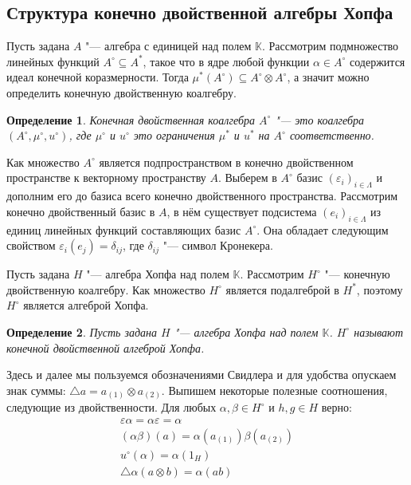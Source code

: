 \documentclass[a4paper, 12pt]{article}
\newtheorem*{definition}{Определение}
\theoremstyle{definition}
\begin{document}
\newpage

\subsection{Структура конечно двойственной алгебры Хопфа}

Пусть задана $A$ "--- алгебра с единицей над полем $\mathbb{K}$. Рассмотрим подмножество линейных функций $A^\circ \subseteq A^*$, такое что в ядре любой функции $\alpha \in A^\circ$ содержится идеал конечной коразмерности. Тогда $\mu^*(A^\circ) \subseteq A^\circ \otimes A^\circ$, а значит можно определить конечную двойственную коалгебру.

\begin{definition}
    Конечная двойственная коалгебра $A^\circ$ "--- это коалгебра $(A^\circ, \mu^\circ, u^\circ)$, где $\mu^\circ$ и $u^\circ$ это ограничения $\mu^*$ и $u^*$ на $A^\circ$ соответственно.
\end{definition}

Как множество $A^\circ$ является подпространством в конечно двойственном пространстве к векторному пространству $A$. 
Выберем в $A^\circ$ базис $(\varepsilon_i)_{i \in \Lambda}$ и дополним его до базиса всего конечно двойственного пространства.
Рассмотрим конечно двойственный базис в $A$, в нём существует подсистема $(e_i)_{i \in \Lambda}$ из единиц линейных функций составляющих базис $A^\circ$. Она обладает следующим свойством $\varepsilon_i(e_j) = \delta_{ij}$, где $\delta_{ij}$ "--- символ Кронекера.

Пусть задана $H$ "--- алгебра Хопфа над полем $\mathbb{K}$. Рассмотрим $H^\circ$ "--- конечную двойственную коалгебру. Как множество $H^\circ$ является подалгеброй в $H^*$, поэтому $H^\circ$ является алгеброй Хопфа.

\begin{definition}
    Пусть задана $H$ "--- алгебра Хопфа над полем $\mathbb{K}$. $H^\circ$ называют конечной двойственной алгеброй Хопфа.
\end{definition}

Здесь и далее мы пользуемся обозначениями Свидлера и для удобства опускаем знак суммы: $\bigtriangleup a = a_{(1)} \otimes a_{(2)}$. 
Выпишем некоторые полезные соотношения, следующие из двойственности. Для любых $\alpha, \beta \in H^\circ$ и $h, g \in H$ верно:
\begin{eqnarray}
    \varepsilon\alpha = \alpha\varepsilon = \alpha \label{str1}\\
    (\alpha\beta)(a) = \alpha(a_{(1)})\beta(a_{(2)}) \label{str2}\\
    u^\circ(\alpha) = \alpha(1_H) \label{str3}\\
    \bigtriangleup\alpha(a \otimes b) = \alpha(ab) \label{str4}
\end{eqnarray}
\end{document}
